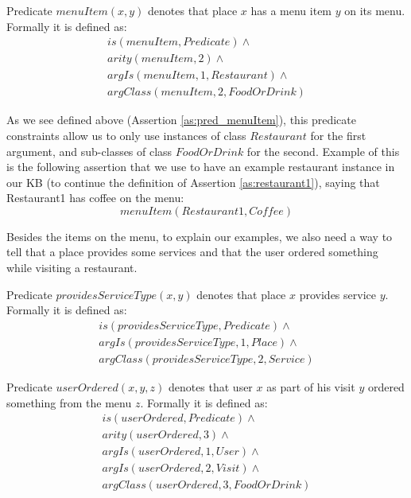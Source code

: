 \begin{definition}\label{def:menuItem}
Predicate $menuItem(x,y)$ denotes that place $x$ has a menu item $y$ on its 
menu. Formally it is defined as:
\begin{equation}\label{as:pred_menuItem}
\begin{gathered}
    is(menuItem,Predicate) \land \\
    arity(menuItem,2) \land \\
	argIs(menuItem,1,Restaurant) \land\\
	argClass(menuItem,2,FoodOrDrink)
\end{gathered}
\end{equation}
\end{definition}
As we see defined above (Assertion \ref{as:pred_menuItem}), this predicate
constraints allow us to only use instances of class $Restaurant$ for the first
argument, and sub-classes of class $FoodOrDrink$ for the second. Example of this
is the following assertion that we use to have an example restaurant instance
in our KB (to continue the definition of Assertion \ref{as:restaurant1}), saying
that Restaurant1 has coffee on the menu:
\begin{equation}
menuItem(Restaurant1,Coffee)
\end{equation}

Besides the items on the menu, to explain our examples, we also need a way to tell that a place provides some services and that the user ordered something while visiting
a restaurant.

\begin{definition}\label{def:serviceType}
Predicate $providesServiceType(x,y)$ denotes that place $x$ provides service 
$y$. Formally it is defined as:
\begin{equation}\label{as:providesServiceType}
\begin{gathered}
    is(providesServiceType,Predicate) \land \\
	argIs(providesServiceType,1,Place) \land\\
	argClass(providesServiceType,2, Service)
\end{gathered}
\end{equation}
\end{definition}

\begin{definition}\label{def:userOrdered}
Predicate $userOrdered(x,y,z)$ denotes that user $x$ as part of his visit $y$ 
ordered something from the menu $z$. Formally it is defined as:
\begin{equation}\label{as:userOrdered}
\begin{gathered}
    is(userOrdered,Predicate) \land \\
    arity(userOrdered,3) \land \\
	argIs(userOrdered,1,User) \land\\
    argIs(userOrdered,2,Visit) \land \\
	argClass(userOrdered,3, FoodOrDrink)
\end{gathered}
\end{equation}
\end{definition}

